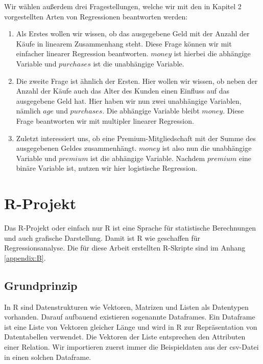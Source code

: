 \pagebreak

Wir wählen außerdem drei Fragestellungen, welche wir mit den in Kapitel 2 vorgestellten Arten von Regressionen beantworten werden:
\begin{enumerate}
  \item Als Erstes wollen wir wissen, ob das ausgegebene Geld mit der Anzahl der Käufe in linearem Zusammenhang steht. Diese Frage können wir mit einfacher linearer Regression beantworten. $money$ ist hierbei die abhängige Variable und $purchases$ ist die unabhängige Variable.
  \item Die zweite Frage ist ähnlich der Ersten. Hier wollen wir wissen, ob neben der Anzahl der Käufe auch das Alter des Kunden einen Einfluss auf das ausgegebene Geld hat. Hier haben wir nun zwei unabhängige Variablen, nämlich $age$ und $purchases$. Die abhängige Variable bleibt $money$. Diese Frage beantworten wir mit multipler linearer Regression.
  \item Zuletzt interessiert uns, ob eine Premium-Mitgliedschaft mit der Summe des ausgegebenen Geldes zusammenhängt. $money$ ist also nun die unabhängige Variable und $premium$ ist die abhängige Variable. Nachdem $premium$ eine binäre Variable ist, nutzen wir hier logistische Regression.
\end{enumerate}

\section{R-Projekt}
\label{section:3:2}

Das R-Projekt oder einfach nur R ist eine Sprache für statistische Berechnungen und auch grafische Darstellung. Damit ist R wie geschaffen für Regressionsanalyse. Die für diese Arbeit erstellten R-Skripte sind im Anhang \ref{appendix:B}.

\subsection{Grundprinzip}
\label{subsection:3:2:1}

In R sind Datenstrukturen wie Vektoren, Matrizen und Listen als Datentypen vorhanden. Darauf aufbauend existieren sogenannte Dataframes. Ein Dataframe ist eine Liste von Vektoren gleicher Länge und wird in R zur Repräsentation von Datentabellen verwendet. Die Vektoren der Liste entsprechen den Attributen einer Relation. Wir importieren zuerst immer die Beispieldaten aus der csv-Datei in einen solchen Dataframe.

